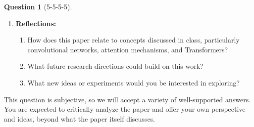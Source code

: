 \documentclass[12pt]{article}
\theoremstyle{definition}
\newtheorem{exercise}{Question}%
\begin{document}
\begin{exercise}[5-5-5-5]
\begin{enumerate}[label=(\theexercise.\arabic*)]
    \item \textbf{Reflections:}
    \begin{enumerate}
        \item How does this paper relate to concepts discussed in class,
        particularly convolutional networks, attention mechanisms,
        and Transformers?
        \item What future research directions could build on this work?
        \item What new ideas or experiments would you be interested
        in exploring?
    \end{enumerate}

\end{enumerate}

This question is subjective, so we will accept a variety of
well-supported answers. You are expected to critically analyze
the paper and offer your own perspective and ideas, beyond what
the paper itself discusses.

\end{exercise}
\end{document}
